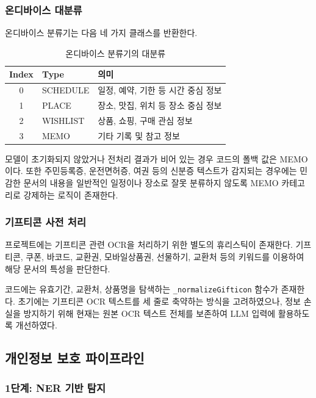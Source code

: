 \documentclass[11pt,a4paper]{article}
\begin{document}
\subsubsection{온디바이스 대분류}

온디바이스 분류기는 다음 네 가지 클래스를 반환한다.

\begin{table}[H]
\centering
\begin{tabularx}{0.8\linewidth}{c l Y}
\toprule
\textbf{Index} & \textbf{Type} & \textbf{의미}\\
 & SCHEDULE & 일정, 예약, 기한 등 시간 중심 정보\\
1 & PLACE & 장소, 맛집, 위치 등 장소 중심 정보\\
2 & WISHLIST & 상품, 쇼핑, 구매 관심 정보\\
3 & MEMO & 기타 기록 및 참고 정보\\
\bottomrule
\end{tabularx}
\caption{온디바이스 분류기의 대분류}
\end{table}

모델이 초기화되지 않았거나 전처리 결과가 비어 있는 경우 코드의 폴백 값은 MEMO이다. 또한 주민등록증, 운전면허증, 여권 등의 신분증 텍스트가 감지되는 경우에는 민감한 문서의 내용을 일반적인 일정이나 장소로 잘못 분류하지 않도록 MEMO 카테고리로 강제하는 로직이 존재한다.

\subsubsection{기프티콘 사전 처리}

프로젝트에는 기프티콘 관련 OCR을 처리하기 위한 별도의 휴리스틱이 존재한다. 기프티콘, 쿠폰, 바코드, 교환권, 모바일상품권, 선물하기, 교환처 등의 키워드를 이용하여 해당 문서의 특성을 판단한다.

코드에는 유효기간, 교환처, 상품명을 탐색하는 \texttt{\_normalizeGifticon} 함수가 존재한다. 초기에는 기프티콘 OCR 텍스트를 세 줄로 축약하는 방식을 고려하였으나, 정보 손실을 방지하기 위해 현재는 원본 OCR 텍스트 전체를 보존하여 LLM 입력에 활용하도록 개선하였다.

\subsection{개인정보 보호 파이프라인}

\subsubsection{1단계: NER 기반 탐지}
\end{document}
